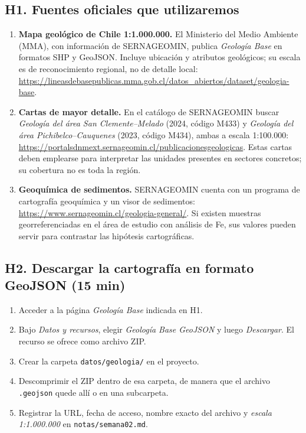\documentclass[11pt,a4paper]{article}
\begin{document}
\subsection{H1. Fuentes oficiales que utilizaremos}
\begin{enumerate}[label=\arabic*.,leftmargin=*]
\item \textbf{Mapa geológico de Chile 1:1.000.000.} El Ministerio del Medio
Ambiente (MMA), con información de SERNAGEOMIN, publica \emph{Geología Base}
en formatos SHP y GeoJSON. Incluye ubicación y atributos geológicos;
 su escala es de reconocimiento regional, no de detalle local:
\url{https://lineasdebasepublicas.mma.gob.cl/datos_abiertos/dataset/geologia-base}.
\item \textbf{Cartas de mayor detalle.} En el catálogo de SERNAGEOMIN buscar
\emph{Geología del área San Clemente--Melado} (2024, código M433)
y \emph{Geología del área Pichibelco--Cauquenes} (2023, código M434),
ambas a escala 1:100.000:
\url{https://portalsdnmext.sernageomin.cl/publicacionesgeologicas}.
Estas cartas deben emplearse para interpretar las unidades presentes en
sectores concretos; su cobertura no es toda la región.
\item \textbf{Geoquímica de sedimentos.} SERNAGEOMIN cuenta con un programa
de cartografía geoquímica y un visor de sedimentos:
\url{https://www.sernageomin.cl/geologia-general/}.
Si existen muestras georreferenciadas en el área de estudio con análisis de
Fe, sus valores pueden servir para contrastar las hipótesis cartográficas.
\end{enumerate}

\subsection{H2. Descargar la cartografía en formato GeoJSON (15 min)}
\begin{enumerate}[nosep]
\item Acceder a la página \emph{Geología Base} indicada en H1.
\item Bajo \emph{Datos y recursos}, elegir \emph{Geología Base GeoJSON}
y luego \emph{Descargar}. El recurso se ofrece como archivo ZIP.
\item Crear la carpeta \texttt{datos/geologia/} en el proyecto.
\item Descomprimir el ZIP dentro de esa carpeta, de manera que el archivo
\texttt{.geojson} quede allí o en una subcarpeta.
\item Registrar la URL, fecha de acceso, nombre exacto del archivo y
\emph{escala 1:1.000.000} en \texttt{notas/semana02.md}.
\end{enumerate}
\end{document}

